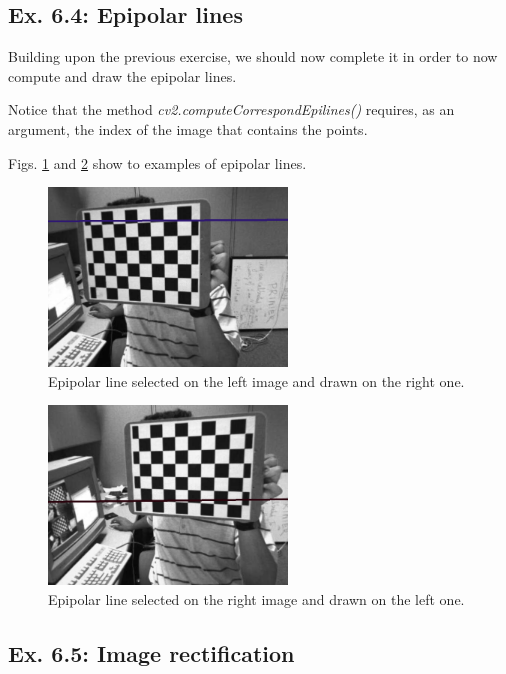 \documentclass[journal]{IEEEtran}
\begin{document}
\subsection{Ex. 6.4: Epipolar lines}

Building upon the previous exercise, we should now complete it in order to now compute and draw the epipolar lines.

Notice that the method \emph{cv2.computeCorrespondEpilines()} requires, as an argument, the index of the image that contains the points.

Figs. \ref{fig:right_epipolar} and \ref{fig:left_epipolar} show to examples of epipolar lines.

\begin{figure}[htp]
  \centering
  \includegraphics[width=2.5in]{imgs/6.4_right_epipolar.png}
  \caption{Epipolar line selected on the left image and drawn on the right one.}
  \label{fig:right_epipolar}
\end{figure}
\FloatBarrier

\begin{figure}[htp]
  \centering
  \includegraphics[width=2.5in]{imgs/6.4_left_epipolar.png}
  \caption{Epipolar line selected on the right image and drawn on the left one.}
  \label{fig:left_epipolar}
\end{figure}
\FloatBarrier

\subsection{Ex. 6.5: Image rectification}
\end{document}
